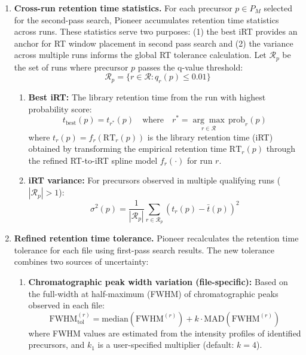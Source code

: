 \documentclass[pdflatex,sn-nature]{sn-jnl}
\begin{document}
\begin{enumerate}

\item{
\textbf{Cross-run retention time statistics.} For each precursor $p \in P_M$ selected for the second-pass search, Pioneer accumulates retention time statistics across runs. These statistics serve two purposes: (1) the best iRT provides an anchor for RT window placement in second pass search and (2) the variance across multiple runs informs the global RT tolerance calculation. Let $\mathcal{R}_p$ be the set of runs where precursor $p$ passes the q-value threshold:
\begin{equation}
    \mathcal{R}_p = \{r \in \mathcal{R} : q_r(p) \leq 0.01\}
\end{equation}

\begin{enumerate}

\item \textbf{Best iRT:} The library retention time from the run with highest probability score:
    \begin{equation}
        t_{\text{best}}(p) = t_{r^*}(p) \quad \text{where} \quad r^* = \underset{r \in \mathcal{R}}{\arg\max} \, \text{prob}_r(p)
    \end{equation}
    where $t_r(p) = f_r(\text{RT}_r(p))$ is the library retention time (iRT) obtained by transforming the empirical retention time $\text{RT}_r(p)$ through the refined RT-to-iRT spline model $f_r(\cdot)$ for run $r$. 
\item \textbf{iRT variance:} For precursors observed in multiple qualifying runs ($|\mathcal{R}_p| > 1$):
    \begin{equation}
        \sigma^2(p) = \frac{1}{|\mathcal{R}_p|} \sum_{r \in \mathcal{R}_p} \left(t_r(p) - \bar{t}(p)\right)^2
    \end{equation}
\end{enumerate}
}

\item{
\textbf{Refined retention time tolerance.} Pioneer recalculates the retention time tolerance for each file using first-pass search results. The new tolerance combines two sources of uncertainty:

\begin{enumerate}
    \item \textbf{Chromatographic peak width variation (file-specific):} Based on the full-width at half-maximum (FWHM) of chromatographic peaks observed in each file:
    \begin{equation}
        \text{FWHM}_{\text{tol}}^{(r)} = \text{median}(\text{FWHM}^{(r)}) + k \cdot \text{MAD}(\text{FWHM}^{(r)})
    \end{equation}
    where FWHM values are estimated from the intensity profiles of identified precursors, and $k_1$ is a user-specified multiplier (default: $k=4$).


\end{enumerate}}
\end{enumerate}
\end{document}

